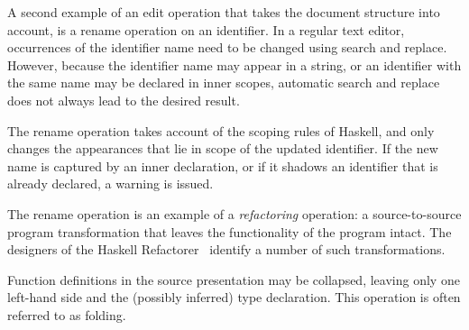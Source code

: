 
A second example of an edit operation that takes the document structure into account, is a rename operation on an identifier. In a regular text editor, occurrences of the identifier name need to be changed using search and replace. However, because the identifier name may appear in a string, or an identifier with the same name may be declared in inner scopes, automatic search and replace does not always lead to the desired result.


The rename operation takes account of the scoping rules of Haskell, and only changes the appearances that lie in scope of the updated identifier. If the new name is captured by an inner declaration, or if it shadows an identifier that is already declared, a warning is issued.

The rename operation is an example of a {\em refactoring} operation: a source-to-source program transformation that leaves  the functionality of the program intact. The designers of the Haskell Refactorer~\cite{reinke03refactoring} identify a number of such transformations.


Function definitions in the source presentation may be collapsed, leaving only one left-hand side and the (possibly inferred) type declaration. This operation is often referred to as folding.

